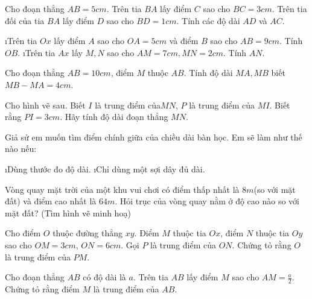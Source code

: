 \begin{bt}
	Cho đoạn thẳng $AB=5cm$. Trên tia $BA$ lấy điểm $C$ sao cho $BC=3cm$. Trên tia đối của tia $BA$ lấy điểm $D$ sao cho $BD=1cm$. Tính các độ dài $AD$ và $AC$.
\end{bt}
\begin{bt}
	\begin{enumerate}[a), leftmargin=*]
		\i Trên tia $Ox$ lấy điểm $A$ sao cho $OA=5cm$ và điểm $B$ sao cho $AB=9cm$. Tính $OB$.
		\i Trên tia $Ax$ lấy $M,N$ sao cho $AM=7cm,MN=2cm$. Tính $AN$.
	\end{enumerate}
	\begin{loigiaichuong1}
		
	\end{loigiaichuong1}
\end{bt}
\begin{bt}
	Cho đoạn thẳng $AB=10cm$, điểm $M$ thuộc $AB$. Tính độ dài $MA,MB$ biết $MB-MA=4cm$.
\end{bt}
\begin{bt}
	Cho hình vẽ sau. Biết $I$ là trung điểm của$MN$, $P$ là trung điểm của $MI$. Biết rằng $PI=3cm$. Hãy tính độ dài đoạn thẳng $MN$.
\end{bt}
\begin{bt}
	Giả sử em muốn tìm điểm chính giữa của chiều dài bàn học. Em sẽ làm như thế nào nếu:
	\begin{enumerate}[a), leftmargin=*]
		\i Dùng thước đo độ dài.
		\i Chỉ dùng một sợi dây đủ dài.
	\end{enumerate}
	\begin{loigiaichuong1}
		
	\end{loigiaichuong1}
\end{bt}
\begin{bt}
	 Vòng quay mặt trời của một khu vui chơi có điểm thấp nhất là $8m$(so với mặt đất) và điểm cao nhất là $64m$. Hỏi trục của vòng quay nằm ở độ cao nào so với mặt đất? (Tìm hình vẽ minh hoạ)
	 \begin{loigiaichuong1}
	 	
	 \end{loigiaichuong1}
\end{bt}
\begin{bt}
	Cho điểm $O$ thuộc đường thẳng $xy$. Điểm $M$ thuộc tia $Ox$, điểm $N$ thuộc tia $Oy$ sao cho $OM=3cm$, $ON=6cm$. Gọi $P$ là trung điểm của $ON$. Chứng tỏ rằng $O$ là trung điểm của $PM$.
	\begin{loigiaichuong1}
		
	\end{loigiaichuong1}
\end{bt}
\begin{bt}
	Cho đoạn thẳng $AB$ có độ dài là $a$. Trên tia $AB$ lấy điểm $M$ sao cho $AM=\frac{a}{2}$. Chứng tỏ rằng điểm $M$ là trung điểm của $AB$.
	\begin{loigiaichuong1}
		
	\end{loigiaichuong1}
\end{bt}

